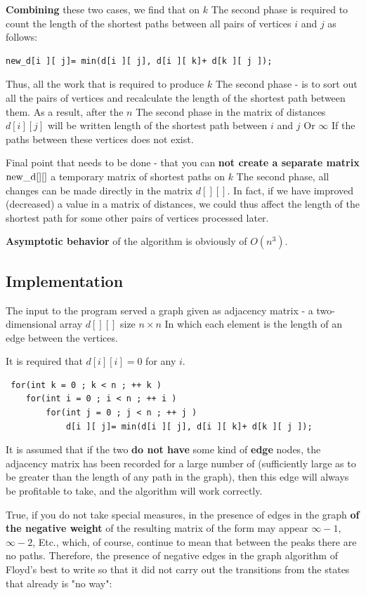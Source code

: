 \textbf{Combining} these two cases, we find that on $k$ The second phase is required to count the length of the shortest paths between all pairs of vertices $i$ and $j$ as follows:

\begin{verbatim}
new_d[i ][ j]= min(d[i ][ j], d[i ][ k]+ d[k ][ j ]); 
\end{verbatim}
Thus, all the work that is required to produce $k$ The second phase - is to sort out all the pairs of vertices and recalculate the length of the shortest path between them. As a result, after the $n$ The second phase in the matrix of distances $d [i][j]$ will be written length of the shortest path between $i$ and $j$ Or $\infty$ If the paths between these vertices does not exist.

Final point that needs to be done - that you can \textbf{not create a separate matrix} $\rm new \_d [][]$ a temporary matrix of shortest paths on $k$ The second phase, all changes can be made directly in the matrix $d [][]$. In fact, if we have improved (decreased) a value in a matrix of distances, we could thus affect the length of the shortest path for some other pairs of vertices processed later.

\textbf{Asymptotic behavior} of the algorithm is obviously of $O (n ^ 3)$.

\subsection{ Implementation }

The input to the program served a graph given as adjacency matrix - a two-dimensional array $d [][]$ size $n \times n$ In which each element is the length of an edge between the vertices.

It is required that $d [i][i] = 0$ for any $i$.

\begin{verbatim}
 for(int k = 0 ; k < n ; ++ k )
    for(int i = 0 ; i < n ; ++ i )
        for(int j = 0 ; j < n ; ++ j )
            d[i ][ j]= min(d[i ][ j], d[i ][ k]+ d[k ][ j ]); 
\end{verbatim}
It is assumed that if the two \textbf{do not have} some kind of \textbf{edge} nodes, the adjacency matrix has been recorded for a large number of (sufficiently large as to be greater than the length of any path in the graph), then this edge will always be profitable to take, and the algorithm will work correctly.

True, if you do not take special measures, in the presence of edges in the graph \textbf{of the negative weight} of the resulting matrix of the form may appear $\infty-1$, $\infty-2$, Etc., which, of course, continue to mean that between the peaks there are no paths. Therefore, the presence of negative edges in the graph algorithm of Floyd's best to write so that it did not carry out the transitions from the states that already is "no way":

